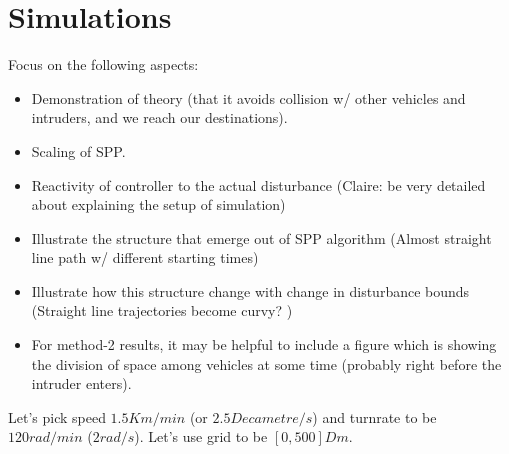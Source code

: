 \section{Simulations}

Focus on the following aspects:
\begin{itemize}
\item Demonstration of theory (that it avoids collision w/ other vehicles and intruders, and we reach our destinations).
\item Scaling of SPP.
\item Reactivity of controller to the actual disturbance (Claire: be very detailed about explaining the setup of simulation)
\item Illustrate the structure that emerge out of SPP algorithm (Almost straight line path w/ different starting times)
\item Illustrate how this structure change with change in disturbance bounds (Straight line trajectories become curvy? )
\item For method-2 results, it may be helpful to include a figure which is showing the division of space among vehicles at some time (probably right before the intruder enters).
\end{itemize}


Let's pick speed $1.5 Km/min$ (or $2.5 Decametre/s$) and turnrate to be $120 rad/min$ ($2 rad/s$). Let's use grid to be $[0, 500] Dm$.

